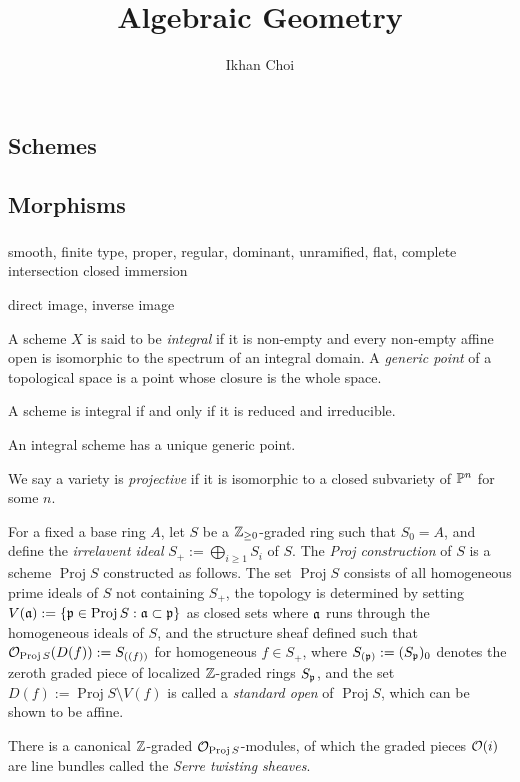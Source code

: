 \documentclass{../../large}
\newcommand{\Proj}{\operatorname{Proj}}
\begin{document}
\title{Algebraic Geometry}
\author{Ikhan Choi}
\maketitle
\tableofcontents

\part{}


\chapter{Schemes}


\chapter{Morphisms}

\section{}
smooth, finite type, proper, regular, dominant, unramified, flat, complete intersection
closed immersion


direct image, inverse image




\begin{prb}
A scheme $X$ is said to be \emph{integral} if it is non-empty and every non-empty affine open is isomorphic to the spectrum of an integral domain.
A \emph{generic point} of a topological space is a point whose closure is the whole space.
\begin{parts}
\item A scheme is integral if and only if it is reduced and irreducible.
\item An integral scheme has a unique generic point.
\end{parts}
\end{prb}


\begin{prb}
We say a variety is \emph{projective} if it is isomorphic to a closed subvariety of $\P^n$ for some $n$.

For a fixed a base ring $A$, let $S$ be a $\Z_{\ge0}$-graded ring such that $S_0=A$, and define the \emph{irrelavent ideal} $S_+:=\bigoplus_{i\ge1}S_i$ of $S$.
The \emph{Proj construction} of $S$ is a scheme $\Proj S$ constructed as follows.
The set $\Proj S$ consists of all homogeneous prime ideals of $S$ not containing $S_+$, the topology is determined by setting $V(\fa):=\{\fp\in\Proj S:\fa\subset\fp\}$ as closed sets where $\fa$ runs through the homogeneous ideals of $S$, and the structure sheaf defined such that $\cO_{\Proj S}(D(f)):=S_{((f))}$ for homogeneous $f\in S_+$, where $S_{(\fp)}:=(S_\fp)_0$ denotes the zeroth graded piece of localized $\Z$-graded rings $S_\fp$, and the set $D(f):=\Proj S\setminus V(f)$ is called a \emph{standard open} of $\Proj S$, which can be shown to be affine.

There is a canonical $\Z$-graded $\cO_{\Proj S}$-modules, of which the graded pieces $\cO(i)$ are line bundles called the \emph{Serre twisting sheaves}.
\end{prb}
\end{document}
